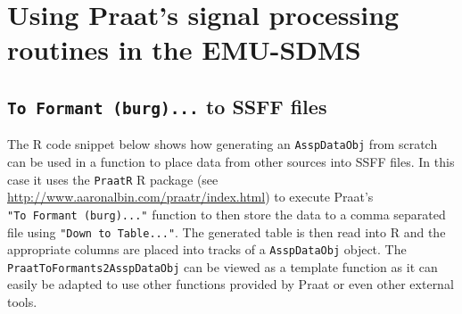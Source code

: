 \documentclass[]{book}
\begin{document}
\hypertarget{sec:app-chap-wrassp-praatsSigProc}{%
\section{Using Praat's signal processing routines in the EMU-SDMS}\label{sec:app-chap-wrassp-praatsSigProc}}

\hypertarget{to-formant-burg...-to-ssff-files}{%
\subsection{\texorpdfstring{\texttt{To\ Formant\ (burg)...} to SSFF files}{To Formant (burg)... to SSFF files}}\label{to-formant-burg...-to-ssff-files}}

The R code snippet below shows how generating an \texttt{AsspDataObj} from scratch can be used in a function to place data from other sources into SSFF files. In this case it uses the \texttt{PraatR} R package (see \url{http://www.aaronalbin.com/praatr/index.html}) to execute Praat's \texttt{"To\ Formant\ (burg)..."} function to then store the data to a comma separated file using \texttt{"Down\ to\ Table..."}. The generated table is then read into R and the appropriate columns are placed into tracks of a \texttt{AsspDataObj} object. The \texttt{PraatToFormants2AsspDataObj} can be viewed as a template function as it can easily be adapted to use other functions provided by Praat or even other external tools.
\end{document}

